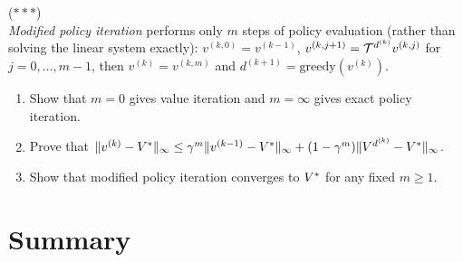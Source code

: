\documentclass[11pt,a4paper]{article}
\begin{document}
\begin{exercise}
\textnormal{(\(***\))} \\
\emph{Modified policy iteration} performs only $m$ steps of policy
evaluation (rather than solving the linear system exactly):
$v^{(k,0)} = v^{(k-1)}$,
$v^{(k,j+1)} = \mathcal{T}^{d^{(k)}} v^{(k,j)}$ for
$j = 0, \ldots, m-1$, then $v^{(k)} = v^{(k,m)}$ and
$d^{(k+1)} = \text{greedy}(v^{(k)})$.
\begin{enumerate}[label=(\alph*)]
    \item Show that $m = 0$ gives value iteration and $m = \infty$
    gives exact policy iteration.
    \item Prove that $\|v^{(k)} - V^*\|_\infty \leq
    \gamma^m \|v^{(k-1)} - V^*\|_\infty +
    (1 - \gamma^m)\|V^{d^{(k)}} - V^*\|_\infty$.
    \item Show that modified policy iteration converges to $V^*$
    for any fixed $m \geq 1$.
\end{enumerate}
\end{exercise}


\section{Summary}
\label{sec:summary}
\end{document}
